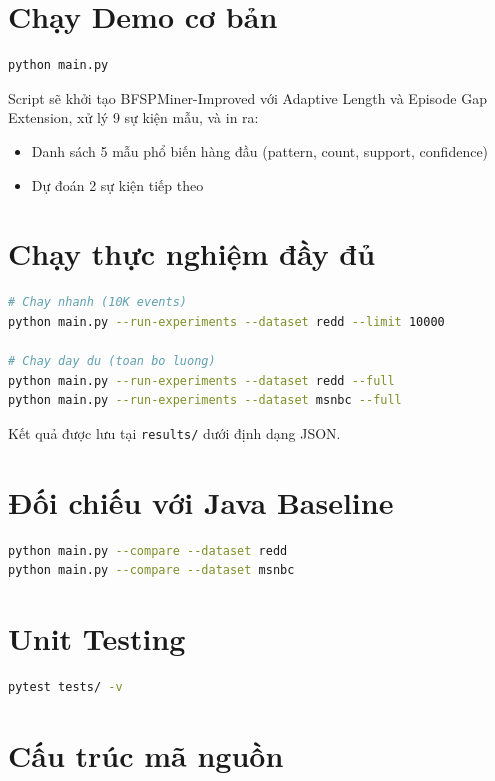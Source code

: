 \documentclass[14pt,a4paper,oneside]{extreport}
\begin{document}
\section{Chạy Demo cơ bản}
\begin{lstlisting}[language=bash, caption={Chay demo toy stream}]
python main.py
\end{lstlisting}

Script sẽ khởi tạo BFSPMiner-Improved với Adaptive Length và Episode Gap Extension, xử lý 9 sự kiện mẫu, và in ra:
\begin{itemize}
    \item Danh sách 5 mẫu phổ biến hàng đầu (pattern, count, support, confidence)
    \item Dự đoán 2 sự kiện tiếp theo
\end{itemize}

\section{Chạy thực nghiệm đầy đủ}
\begin{lstlisting}[language=bash, caption={Chay benchmark suite}]
# Chay nhanh (10K events)
python main.py --run-experiments --dataset redd --limit 10000

# Chay day du (toan bo luong)
python main.py --run-experiments --dataset redd --full
python main.py --run-experiments --dataset msnbc --full
\end{lstlisting}

Kết quả được lưu tại \texttt{results/} dưới định dạng JSON.

\section{Đối chiếu với Java Baseline}
\begin{lstlisting}[language=bash, caption={So sanh Python vs Java}]
python main.py --compare --dataset redd
python main.py --compare --dataset msnbc
\end{lstlisting}

\section{Unit Testing}
\begin{lstlisting}[language=bash, caption={Chay kiem thu}]
pytest tests/ -v
\end{lstlisting}

\section{Cấu trúc mã nguồn}
\end{document}

